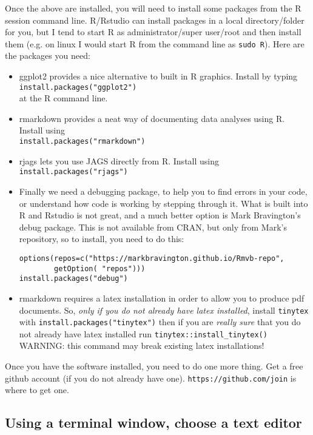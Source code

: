 \documentclass[10pt] {article}
\theoremstyle{definition}
\begin{document}
Once the above are installed, you will need to install some packages from the R session command line. R/Rstudio can install packages in a local directory/folder for you, but I tend to start R as administrator/super user/root and then install them (e.g. on linux I would start R from the command line as \verb+sudo R+). Here are the packages you need:
\begin{itemize}
\item ggplot2 provides a nice alternative to built in R graphics. Install by typing\\
\verb+install.packages("ggplot2")+\\
at the R command line.
\item rmarkdown provides a neat way of documenting data analyses using R. Install using\\
 \verb+install.packages("rmarkdown")+
\item rjags lets you use JAGS directly from R. Install using\\
 \verb+install.packages("rjags")+
\item Finally we need a debugging package, to help you to find errors in your code, or understand how code is working by stepping through it. What is built into R and Rstudio is not great, and a much better option is Mark Bravington's debug package. This is not available from CRAN, but only from Mark's repository, so to install, you need to do this:
\begin{verbatim}
options(repos=c("https://markbravington.github.io/Rmvb-repo",
        getOption( "repos")))
install.packages("debug")
\end{verbatim}
\item rmarkdown requires a latex installation in order to allow you to produce pdf documents. So, {\em only if you do not already have latex installed}, install {\tt tinytex} with
\verb+install.packages("tinytex")+
then if you are {\em really sure} that you do not already have latex installed run 
\verb+tinytex::install_tinytex()+
WARNING: this command may break existing latex installations!
\end{itemize}
Once you have the software installed, you need to do one more thing. Get a free github account (if you do not already have one).  \verb+https://github.com/join+ is where to get one. 


\subsection{Using a terminal window, choose a text editor}
\end{document}
